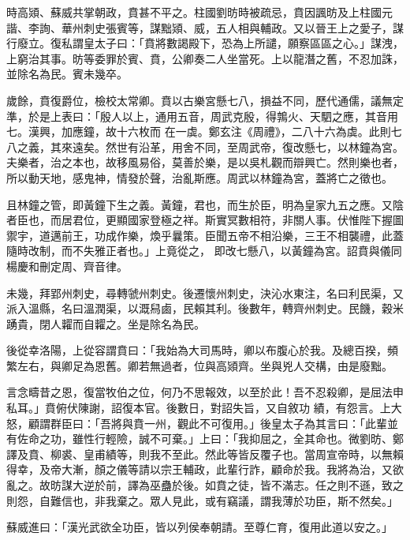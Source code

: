 \begin{pinyinscope}
 時高熲、蘇威共掌朝政，賁甚不平之。柱國劉昉時被疏忌，賁因諷昉及上柱國元諧、李詢、華州刺史張賓等，謀黜熲、威，五人相與輔政。又以晉王上之愛子，謀行廢立。復私謂皇太子曰：「賁將數謁殿下，恐為上所譴，願察區區之心。」謀洩，上窮治其事。昉等委罪於賓、賁，公卿奏二人坐當死。上以龍潛之舊，不忍加誅，並除名為民。賓未幾卒。



 歲餘，賁復爵位，檢校太常卿。賁以古樂宮懸七八，損益不同，歷代通儒，議無定準，於是上表曰：「殷人以上，通用五音，周武克殷，得鶉火、天駟之應，其音用七。漢興，加應鐘，故十六枚而
 在一虡。鄭玄注《周禮》，二八十六為虡。此則七八之義，其來遠矣。然世有沿革，用舍不同，至周武帝，復改懸七，以林鐘為宮。夫樂者，治之本也，故移風易俗，莫善於樂，是以吳札觀而辯興亡。然則樂也者，所以動天地，感鬼神，情發於聲，治亂斯應。周武以林鐘為宮，蓋將亡之徵也。



 且林鐘之管，即黃鐘下生之義。黃鐘，君也，而生於臣，明為皇家九五之應。又陰者臣也，而居君位，更顯國家登極之祥。斯實冥數相符，非關人事。伏惟陛下握圖禦宇，道邁前王，功成作樂，煥乎曩策。臣聞五帝不相沿樂，三王不相襲禮，此蓋隨時改制，而不失雅正者也。」上竟從之，
 即改七懸八，以黃鐘為宮。詔賁與儀同楊慶和刪定周、齊音律。



 未幾，拜郢州刺史，尋轉虢州刺史。後遷懷州刺史，決沁水東注，名曰利民渠，又派入溫縣，名曰溫潤渠，以溉舄鹵，民賴其利。後數年，轉齊州刺史。民饑，穀米踴貴，閉人糶而自糶之。坐是除名為民。



 後從幸洛陽，上從容謂賁曰：「我始為大司馬時，卿以布腹心於我。及總百揆，頻繁左右，與卿足為恩舊。卿若無過者，位與高熲齊。坐與兇人交構，由是廢黜。



 言念疇昔之恩，復當牧伯之位，何乃不思報效，以至於此！吾不忍殺卿，是屈法申私耳。」賁俯伏陳謝，詔復本官。後數日，對詔失旨，又自敘功
 績，有怨言。上大怒，顧謂群臣曰：「吾將與賁一州，觀此不可復用。」後皇太子為其言曰：「此輩並有佐命之功，雖性行輕險，誠不可棄。」上曰：「我抑屈之，全其命也。微劉昉、鄭譯及賁、柳裘、皇甫績等，則我不至此。然此等皆反覆子也。當周宣帝時，以無賴得幸，及帝大漸，顏之儀等請以宗王輔政，此輩行詐，顧命於我。我將為治，又欲亂之。故昉謀大逆於前，譯為巫蠱於後。如賁之徒，皆不滿志。任之則不遜，致之則怨，自難信也，非我棄之。眾人見此，或有竊議，謂我薄於功臣，斯不然矣。」



 蘇威進曰：「漢光武欲全功臣，皆以列侯奉朝請。至尊仁育，復用此道以安之。」




\end{pinyinscope}
